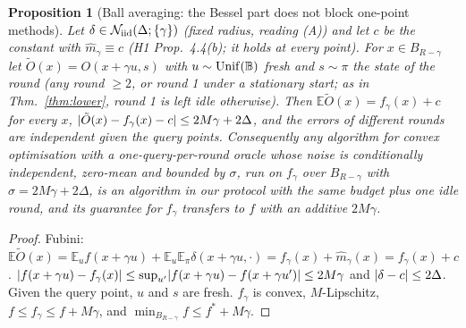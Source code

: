 \documentclass[11pt,a4paper]{article}
\numberwithin{equation}{section}
\newtheorem{proposition}[theorem]{Proposition}
\theoremstyle{definition}
\theoremstyle{remark}
\newcommand{\E}{\mathbb E}\newcommand{\R}{\mathbb R}\newcommand{\Z}{\mathbb Z}\newcommand{\Prob}{\mathbb P}
\newcommand{\cN}{\mathcal N}\newcommand{\cA}{\mathcal A}\newcommand{\cG}{\mathcal G}\newcommand{\cF}{\mathcal F}
\newcommand{\Unif}{\mathrm{Unif}}\newcommand{\TV}{\mathrm{TV}}\newcommand{\BC}{\mathrm{BC}}\newcommand{\tmix}{t_{\rm mix}}
\begin{document}
\begin{proposition}[Ball averaging: the Bessel part does not block one-point methods]\label{prop:ballavg}
Let $\delta\in\cN_\iid(\Delta;\{\gamma\})$ (fixed radius, reading (A)) and let $c$ be the constant with $\hat m_\gamma\equiv c$ (H1 Prop.~4.4(b); it holds at \emph{every} point). For $x\in B_{R-\gamma}$ let $\tilde O(x)=O(x+\gamma u,s)$ with $u\sim\Unif(\Ball)$ fresh and $s\sim\pi$ the state of the round (any round $\ge2$, or round 1 under a stationary start; as in Thm.~\ref{thm:lower}, round 1 is left idle otherwise). Then $\E\tilde O(x)=f_\gamma(x)+c$ for every $x$, $\lvert \tilde O(x)-f_\gamma(x)-c\rvert\le2M\gamma+2\Delta$, and the errors of different rounds are independent given the query points. Consequently any algorithm for convex optimisation with a one-query-per-round oracle whose noise is conditionally independent, zero-mean and bounded by $\sigma$, run on $f_\gamma$ over $B_{R-\gamma}$ with $\sigma=2M\gamma+2\Delta$, is an algorithm in our protocol with the same budget plus one idle round, and its guarantee for $f_\gamma$ transfers to $f$ with an additive $2M\gamma$.
\end{proposition}
\begin{proof}
Fubini: $\E\tilde O(x)=\E_uf(x+\gamma u)+\E_u\E_\pi\delta(x+\gamma u,\cdot)=f_\gamma(x)+\hat m_\gamma(x)=f_\gamma(x)+c$. $\lvert f(x+\gamma u)-f_\gamma(x)\rvert\le\sup_{u'}\lvert f(x+\gamma u)-f(x+\gamma u')\rvert\le2M\gamma$ and $\lvert \delta-c\rvert\le2\Delta$. Given the query point, $u$ and $s$ are fresh. $f_\gamma$ is convex, $M$-Lipschitz, $f\le f_\gamma\le f+M\gamma$, and $\min_{B_{R-\gamma}}f\le f^*+M\gamma$.
\end{proof}
\end{document}
